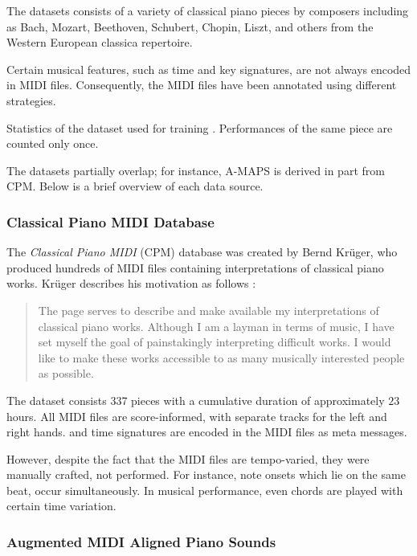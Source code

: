 The datasets consists of a variety of classical piano pieces by composers including as Bach, Mozart, Beethoven, Schubert, Chopin, Liszt, and others from the Western European classica repertoire.

Certain musical features, such as time and key signatures, are not always encoded in MIDI files. Consequently, the MIDI files have been annotated using different strategies.

\begin{table}[ht!]
\centering

\caption[Statistics of the dataset used for training]{Statistics of the dataset used for training \cite{Liu2022}. Performances of the same piece are counted only once.}
\end{table}

The datasets partially overlap; for instance, A-MAPS is derived in part from CPM. Below is a brief overview of each data source.

\subsubsection{Classical Piano MIDI Database}

The \emph{Classical Piano MIDI} (CPM) database was created by Bernd Krüger, who produced hundreds of MIDI files containing interpretations of classical piano works. Krüger describes his motivation as follows \cite{Krueger1996}:

\begin{quote}The page serves to describe and make available my interpretations of classical piano works. Although I am a layman in terms of music, I have set myself the goal of painstakingly interpreting difficult works. I would like to make these works accessible to as many musically interested people as possible.\end{quote}

The dataset consists 337 pieces with a cumulative duration of approximately $23$ hours. All MIDI files are score-informed, with separate tracks for the left and right hands.  and time signatures are encoded in the MIDI files as meta messages.

However, despite the fact that the MIDI files are tempo-varied, they were manually crafted, not performed. For instance, note onsets which lie on the same beat, occur simultaneously. In musical performance, even chords are played with certain time variation.

\subsubsection{Augmented MIDI Aligned Piano Sounds}

